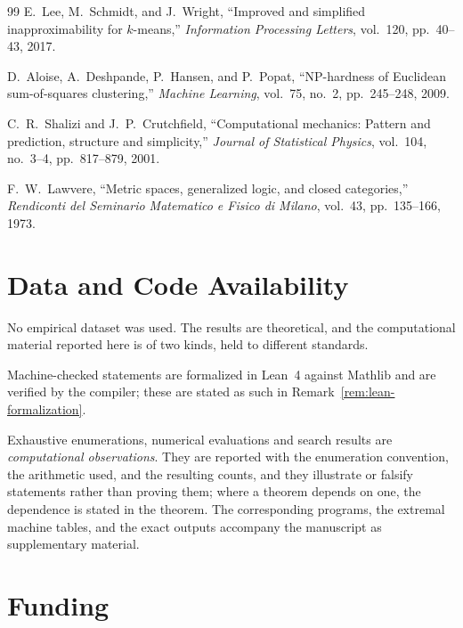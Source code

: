 \documentclass[12pt]{article}
\theoremstyle{definition}
\begin{document}
\begin{thebibliography}{99}
E.~Lee, M.~Schmidt, and J.~Wright,
``Improved and simplified inapproximability for $k$-means,''
\emph{Information Processing Letters}, vol.~120, pp.~40--43, 2017.

D.~Aloise, A.~Deshpande, P.~Hansen, and P.~Popat,
``NP-hardness of Euclidean sum-of-squares clustering,''
\emph{Machine Learning}, vol.~75, no.~2, pp.~245--248, 2009.

C.~R.~Shalizi and J.~P.~Crutchfield,
``Computational mechanics: Pattern and prediction, structure and simplicity,''
\emph{Journal of Statistical Physics}, vol.~104, no.~3--4, pp.~817--879, 2001.

F.~W.~Lawvere,
``Metric spaces, generalized logic, and closed categories,''
\emph{Rendiconti del Seminario Matematico e Fisico di Milano},
vol.~43, pp.~135--166, 1973.

\end{thebibliography}

\section*{Data and Code Availability}

No empirical dataset was used.  The results are theoretical, and the
computational material reported here is of two kinds, held to different
standards.

Machine-checked statements are formalized in Lean~4 against Mathlib and are
verified by the compiler; these are stated as such in
Remark~\ref{rem:lean-formalization}.

Exhaustive enumerations, numerical evaluations and search results are
\emph{computational observations}.  They are reported with the enumeration
convention, the arithmetic used, and the resulting counts, and they illustrate
or falsify statements rather than proving them; where a theorem depends on one,
the dependence is stated in the theorem.  The corresponding programs, the
extremal machine tables, and the exact outputs accompany the manuscript as
supplementary material.

\section*{Funding}
\end{document}
